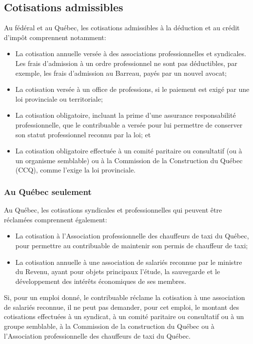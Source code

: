 \subsection{Cotisations admissibles}
Au fédéral et au Québec, les cotisations admissibles à la déduction et au crédit d'impôt comprennent notamment:
\begin{itemize}
	\item La cotisation annuelle versée à des associations professionnelles et syndicales. Les frais d'admission à un ordre professionnel ne sont pas déductibles, par exemple, les frais d'admission au Barreau, payés par un nouvel avocat;
	\item La cotisation versée à un office de professions, si le paiement est exigé par une loi provinciale ou territoriale;
	\item La cotisation obligatoire, incluant la prime d'une assurance responsabilité professionnelle, que le contribuable a versée pour lui permettre de conserver son statut professionnel reconnu par la loi; et
	\item La cotisation obligatoire effectuée à un comité paritaire ou consultatif (ou à un organisme semblable) ou à la Commission de la Construction du Québec (CCQ), comme l'exige la loi provinciale.
\end{itemize}

\subsubsection{Au Québec seulement}
Au Québec, les cotisations syndicales et professionnelles qui peuvent être réclamées comprennent également:
\begin{itemize}
	\item La cotisation à l'Association professionnelle des chauffeurs de taxi du Québec, pour permettre au contribuable de maintenir son permis de chauffeur de taxi;
	\item La cotisation annuelle à une association de salariés reconnue par le ministre du Revenu, ayant pour objets principaux l'étude, la sauvegarde et le développement des intérêts économiques de ses membres.
\end{itemize}

Si, pour un emploi donné, le contribuable réclame la cotisation à une association de salariés reconnue, il ne peut pas demander, pour cet emploi, le montant des cotisations effectuées à un syndicat, à un comité paritaire ou consultatif ou à un groupe semblable, à la Commission de la construction du Québec ou à l'Association professionnelle des chauffeurs de taxi du Québec.


